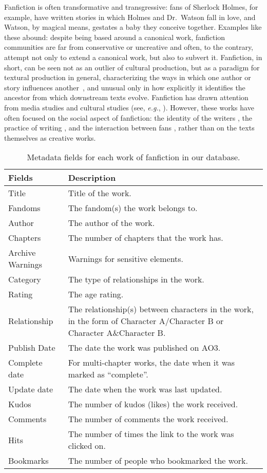 \documentclass[letterpaper]{article} %
\begin{document}
Fanfiction is often transformative and transgressive: fans of Sherlock Holmes, for example, have written stories in which Holmes and Dr.\ Watson fall in love, and Watson, by magical means, gestates a baby they conceive together. Examples like these abound: despite being based around a canonical work, fanfiction communities are far from conservative or uncreative and often, to the contrary, attempt not only to extend a canonical work, but also to subvert it. Fanfiction, in short, can be seen not as an outlier of cultural production, but as a paradigm for textural production in general, characterizing the ways in which one author or story influences another~\cite{rohrs6north}, and  unusual only in how explicitly it identifies the ancestor from which downstream texts evolve. Fanfiction has drawn attention from media studies and cultural studies (see, \emph{e.g.}, \cite{thomas2011fanfiction}). However, these works have often focused on the social aspect of fanfiction: the identity of the writers \cite{black2006language}, the practice of writing \cite{LIT:LIT12061}, and the interaction between fans \cite{hills2015expertise}, rather than on the texts themselves as creative works.


\begin{table}
\centering
\begin{tabular}[width=0.9\textwidth]{p{3cm}p{5cm}}
\toprule
Fields & Description \\ 
   \hline

Title & Title of the work. \\
Fandoms & The fandom(s) the work belongs to. \\
Author & The author of the work.  \\
Chapters & The number of chapters that the work has. \\
Archive Warnings & Warnings for sensitive elements. \\
Category & The type of relationships in the work. \\
Rating & The age rating. \\
Relationship & The relationship(s) between characters in the work, in the form of Character A/Character B
or Character A\&Character B. \\
Publish Date & The date the work was published on AO3. \\
Complete date & For multi-chapter works, the date when it was marked as ``complete''.\\
Update date & The date when the work was last updated. \\
\hline

Kudos & The number of kudos (likes) the work received. \\
Comments & The number of comments the work received.\\
Hits & The number of times the link to the work was clicked on. \\
Bookmarks & The number of people who bookmarked the work.\\

\bottomrule
\end{tabular}
\caption{Metadata fields for each work of fanfiction in our database.}
\label{tab:metadata}
\end{table}%
\end{document}
